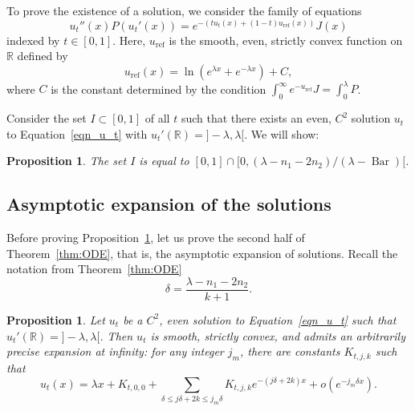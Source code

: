 \documentclass[JEP,XML,SOM,Unicode, NoEqCountersInSection, NoFloatCountersInSection]{cedram}
\theoremstyle{plain}
\newtheorem{prop}[thm]{Proposition}
\theoremstyle{definition}
\DeclareMathOperator{\barDH}{Bar}
\begin{document}
To prove the existence of a solution, we consider the family of equations
\begin{equation}
\label{eqn_u_t}
u_t''(x)P(u_t'(x))=e^{-(tu_t(x)+(1-t)u_{\mathrm{ref}}(x))}J(x)
\end{equation}
indexed by $t\in [0,1]$.
Here, $u_{\mathrm{ref}}$ is the smooth, even, strictly convex function
on $\mathbb{R}$ defined by
\begin{equation}
u_{\mathrm{ref}}(x)=\ln(e^{\lambda x}+e^{-\lambda x})+C,
\end{equation}
where $C$ is the constant determined by the condition
$\int_0^{\infty}e^{-u_{\mathrm{ref}}}J = \int_0^{\lambda}P$.

Consider the set $I\subset [0,1]$ of all $t$ such that there exists an even, $C^2$
solution $u_t$ to Equation~\eqref{eqn_u_t} with $u_t'(\mathbb{R})={}]-\lambda,\lambda[$.
We will show:

\begin{prop}
\label{prop:cont}
The set $I$ is equal to
$ [0,1]\cap [0,(\lambda-n_1-2n_2)/(\lambda-\barDH)[$.
\end{prop}

\subsection{Asymptotic expansion of the solutions}

Before proving Proposition~\ref{prop:cont}, let us prove the second half of Theorem~\ref{thm:ODE},
that is, the asymptotic expansion of solutions.
Recall the notation from Theorem~\ref{thm:ODE}
\[ \delta=\frac{\lambda-n_1-2n_2}{k+1}. \]

\begin{prop}
\label{prop:cont-exp}
Let $u_t$ be a $C^2$, even solution to Equation~\eqref{eqn_u_t}
such that $u_t'(\mathbb{R})={}]-\lambda,\lambda[$. Then $u_t$ is smooth,
strictly convex, and admits an arbitrarily precise expansion at infinity:
for any integer $j_m$, there are constants $K_{t,j,k}$
such that
\[ u_t(x)= \lambda x +K_{t,0,0}+
\sum_{\delta\leq j\delta+2k\leq j_m\delta}K_{t,j,k}e^{-(j\delta+2k)x}
+o(e^{-j_m\delta x}). \]
\end{prop}
\end{document}
